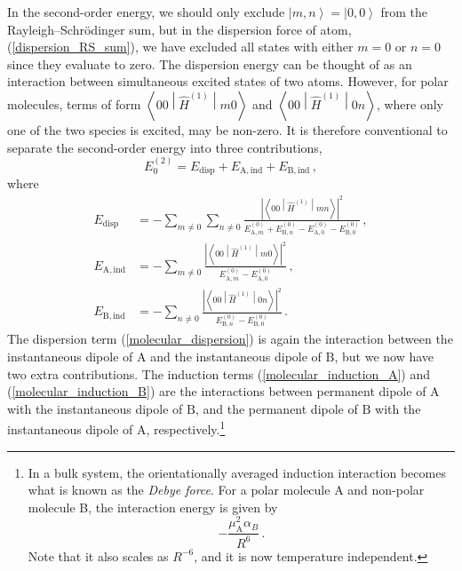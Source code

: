 \documentclass{article}
\theoremstyle{plain}\theoremheaderfont{\normalfont\itshape}\theorembodyfont{\rmfamily}\theoremseparator{.}\newtheorem*{rem}{Remark}\newtheorem*{ex}{Example}\newtheorem*{proof}{Proof}\newtheorem*{altp}{Alternative proof}
\theoremstyle{plain}\theoremheaderfont{\normalfont\bfseries}\theorembodyfont{\rmfamily}\theoremseparator{.}\newtheorem{thm}{Theorem}[section]\newtheorem{lem}[thm]{Lemma}\newtheorem{prop}[thm]{Proposition}\newtheorem*{cor}{Corollary}\newtheorem{defn}[thm]{Definition}\newtheorem{clm}[thm]{Claim}\newtheorem{clminproof}{Claim}
\theoremstyle{break}\theoremheaderfont{\normalfont\itshape}\theorembodyfont{\rmfamily}\theoremseparator{.\medskip}\newtheorem*{proofskip}{Proof}\newtheorem*{exs}{Examples}\newtheorem*{rems}{Remarks}
\theoremstyle{break}\theoremheaderfont{\normalfont\bfseries}\theorembodyfont{\rmfamily}\theoremseparator{.\medskip}\newtheorem{lemskip}[thm]{Lemma}\newtheorem{defnskip}[thm]{Definition}\newtheorem{propskip}[thm]{Proposition}\newtheorem{thmskip}[thm]{Theorem}
\numberwithin{equation}{section}
\newcommand{\ket}[1]{\left| #1 \right\rangle}
\newcommand{\mel}[3]{\left\langle #1 \middle| #2 \middle| #3 \right\rangle}
\newcommand{\abs}[1]{\left| #1 \right|}
\renewcommand{\AA}{\mathrm{A}}
\newcommand{\BB}{\mathrm{B}}
\begin{document}
    In the second-order energy, we should only exclude \(\ket{m,n}=\ket{0,0}\) from the Rayleigh--Schr\"{o}dinger sum, but in the dispersion force of atom, (\ref{dispersion_RS_sum}), we have excluded all states with either \(m=0\) or \(n=0\) since they evaluate to zero. The dispersion energy can be thought of as an interaction between simultaneous excited states of two atoms. However, for polar molecules, terms of form \(\mel{00}{\hat{H}^{(1)}}{m0}\) and \(\mel{00}{\hat{H}^{(1)}}{0n}\), where only one of the two species is excited, may be non-zero. It is therefore conventional to separate the second-order energy into three contributions,
    \begin{equation}
        E_0^{(2)}=E_{\text{disp}}+E_{\AA,\text{ind}}+E_{\BB,\text{ind}}\,,
    \end{equation}
    where
    \begin{align}
        E_{\text{disp}}&=-\sum_{m\ne 0}\sum_{n\ne 0}\frac{\abs{\mel{00}{\hat{H}^{(1)}}{mn}}^2}{E_{\AA,m}^{(0)}+E_{\BB,n}^{(0)}-E_{\AA,0}^{(0)}-E_{\BB,0}^{(0)}}\,, \label{molecular_dispersion}\\
        E_{\AA,\text{ind}}&=-\sum_{m\ne 0}\frac{\abs{\mel{00}{\hat{H}^{(1)}}{m0}}^2}{E_{\AA,m}^{(0)}-E_{\AA,0}^{(0)}}\,, \label{molecular_induction_A} \\
        E_{\BB,\text{ind}}&=-\sum_{n\ne 0}\frac{\abs{\mel{00}{\hat{H}^{(1)}}{0n}}^2}{E_{\BB,n}^{(0)}-E_{\BB,0}^{(0)}}\,.\label{molecular_induction_B}
    \end{align}
    The dispersion term (\ref{molecular_dispersion}) is again the interaction between the instantaneous dipole of \(\AA\) and the instantaneous dipole of \(\BB\), but we now have two extra contributions. The induction terms (\ref{molecular_induction_A}) and (\ref{molecular_induction_B}) are the interactions between permanent dipole of \(\AA\) with the instantaneous dipole of \(\BB\), and the permanent dipole of \(\BB\) with the instantaneous dipole of \(\AA\), respectively.\footnote{In a bulk system, the orientationally averaged induction interaction becomes what is known as the \textit{Debye force}. For a polar molecule A and non-polar molecule B, the interaction energy is given by
    \begin{equation}
        -\frac{\mu_\AA^2\alpha_B}{R^6}\,.
    \end{equation}
    Note that it also scales as \(R^{-6}\), and it is now temperature independent.}

    \newpage
 
\end{document}
